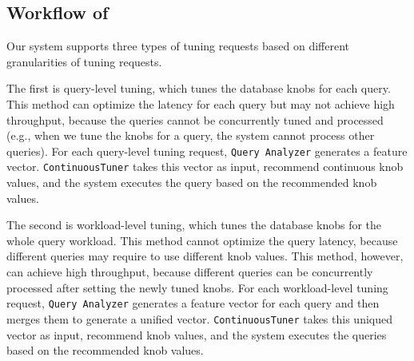 \subsection{Workflow of \large{\oursys}}
\label{subsec:def:workflow}

Our system supports three types of tuning requests based on different  granularities of tuning requests. 


\vspace{.25em}
 The first is query-level tuning, which tunes the database knobs for each query. This method can optimize the latency for each query but may not achieve high throughput, because the queries cannot be concurrently tuned and processed (e.g., when we tune the knobs for a query, the system cannot process other queries). For each query-level tuning request, \texttt{Query Analyzer}  generates a feature vector. \texttt{ContinuousTuner} takes this vector as input, recommend continuous knob values, and the system executes the query based on the recommended knob values.

 
\vspace{.25em}
The second is workload-level tuning, which tunes the database knobs for the whole query workload. This method cannot optimize the query latency, because different queries may require to use different knob values. This method, however, can achieve high throughput, because different queries can be concurrently processed after setting the newly tuned knobs. For each workload-level tuning request, \texttt{Query Analyzer}  generates a feature vector for each query and then merges them to generate a unified vector. \texttt{ContinuousTuner} takes this uniqued vector as input, recommend knob values, and the system executes the queries based on the recommended knob values.

